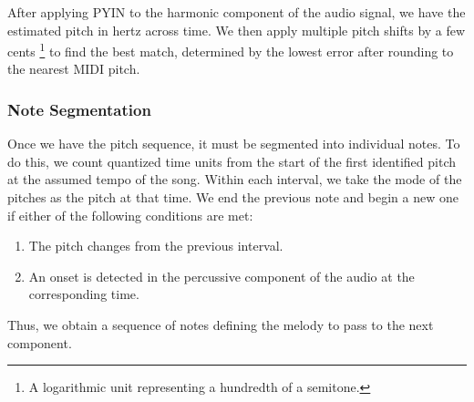 After applying PYIN to the harmonic component of the audio signal, we have the estimated pitch in hertz across time. We then apply multiple pitch shifts by a few cents \footnote{A logarithmic unit representing a hundredth of a semitone.} to find the best match, determined by the lowest error after rounding to the nearest MIDI pitch.

\subsubsection{Note Segmentation}

Once we have the pitch sequence, it must be segmented into individual notes. To do this, we count quantized time units from the start of the first identified pitch at the assumed tempo of the song. Within each interval, we take the mode of the pitches as the pitch at that time. We end the previous note and begin a new one if either of the following conditions are met:
\begin{enumerate}
    \item The pitch changes from the previous interval.
    \item An onset is detected in the percussive component of the audio at the corresponding time.
\end{enumerate}
Thus, we obtain a sequence of notes defining the melody to pass to the next component.
